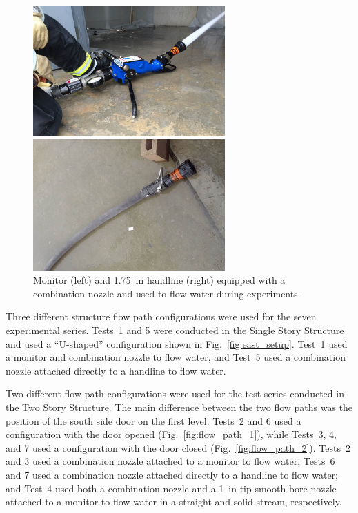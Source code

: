 \documentclass[12pt,oneside]{book}
\begin{document}
\begin{figure}[!ht]
	\minipage{3in}
	\begin{center}
		\includegraphics[width=2.9in]{../Figures/Pictures/monitor}
	\end{center} 
	\endminipage \hfill
	\minipage{3in}
	\begin{center}
		\includegraphics[width=2.9in]{../Figures/Pictures/handline}
	\end{center}
	\endminipage \hfill
	\caption[Monitor and handline equipped with a combination nozzle.]{Monitor (left) and 1.75~in handline (right) equipped with a combination nozzle and used to flow water during experiments.}
	\label{fig:monitor+handline}
\end{figure}

Three different structure flow path configurations were used for the seven experimental series. Tests~1 and 5 were conducted in the Single Story Structure and used a ``U-shaped'' configuration shown in Fig.~\ref{fig:east_setup}. Test~1 used a monitor and combination nozzle to flow water, and Test~5 used a combination nozzle attached directly to a handline to flow water.

Two different flow path configurations were used for the test series conducted in the Two Story Structure. The main difference between the two flow paths was the position of the south side door on the first level. Tests~2 and 6 used a configuration with the door opened (Fig.~\ref{fig:flow_path_1}), while Tests~3, 4, and 7 used a configuration with the door closed (Fig.~\ref{fig:flow_path_2}). Tests~2 and 3 used a combination nozzle attached to a monitor to flow water; Tests~6 and 7 used a combination nozzle attached directly to a handline to flow water; and Test~4 used both a combination nozzle and a 1~in tip smooth bore nozzle attached to a monitor to flow water in a straight and solid stream, respectively. 
\end{document}

